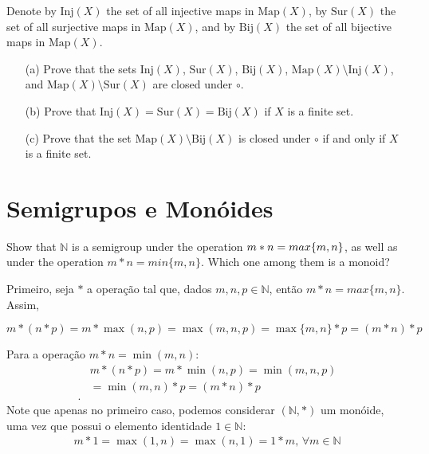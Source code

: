 \begin{exercicio}{1.25}
	Denote by \( \text{Inj}(X) \) the set of all injective maps in \( \text{Map}(X) \), by \( \text{Sur}(X) \) the set of all surjective maps in \( \text{Map}(X) \), and by \( \text{Bij}(X) \) the set of all bijective maps in \( \text{Map}(X) \).

	\begin{enumerate}
		\item[(a)] Prove that the sets \( \text{Inj}(X) \), \( \text{Sur}(X) \), \( \text{Bij}(X) \), \( \text{Map}(X) \setminus \text{Inj}(X) \), and \( \text{Map}(X) \setminus \text{Sur}(X) \) are closed under \( \circ \).
		\item[(b)] Prove that \( \text{Inj}(X) = \text{Sur}(X) = \text{Bij}(X) \) if \( X \) is a finite set.
		\item[(c)] Prove that the set \( \text{Map}(X) \setminus \text{Bij}(X) \) is closed under \( \circ \) if and only if \( X \) is a finite set.
	\end{enumerate}
\end{exercicio}

\begin{solucao}

\end{solucao}

\section{Semigrupos e Monóides}

\begin{exercicio}{1.40}
	Show that \(\mathbb{N}\) is a semigroup under the operation \(\newline m * n = max\{m, n\}\), as well as under the operation \(m  * n = min\{m, n\}\). Which one among them is a monoid?
\end{exercicio}

\begin{solucao}
	Primeiro, seja $*$ a operação tal que, dados \(m, n, p \in \mathbb{N}\), então \(m * n = max\{m, n\}\). Assim, 
	
	\[m * (n * p) = m * \max(n, p) = \max(m, n, p) = \max\{m, n\} * p = (m*n)*p\]

	Para a operação \(m*n = \min(m,n)\):
	\begin{align*}
		&m * (n*p) = m * \min(n,p) = \min(m,n,p) \\
		& = \min(m,n) * p = (m * n) * p \\.
	\end{align*}
	Note que apenas no primeiro caso, podemos considerar \((\mathbb{N}, *)\) um monóide, uma vez que possui o elemento identidade $1 \in \mathbb{N}$:
	\begin{align*}
		m * 1 = \max(1,n) = \max(n, 1) = 1*m, \, \forall m \in \mathbb{N}
	\end{align*}
\end{solucao}


